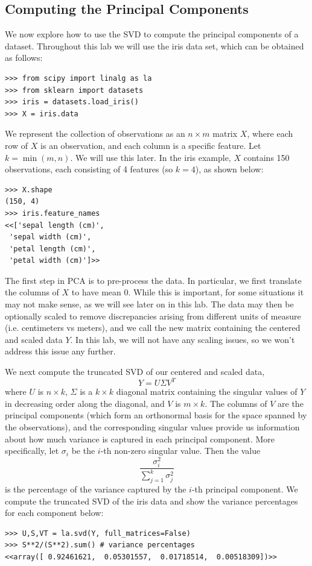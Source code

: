 \subsection*{Computing the Principal Components}
We now explore how to use the SVD to compute the principal components of a dataset.
Throughout this lab we will use the  iris data set, which can be obtained as follows:
\begin{lstlisting}
>>> from scipy import linalg as la
>>> from sklearn import datasets
>>> iris = datasets.load_iris()
>>> X = iris.data
\end{lstlisting}
We represent the collection of observations as an $n \times m$ matrix $X$, where each row of $X$ is an observation, and each column is a specific feature.
Let $k = \min(m,n)$.  We will use this later.
In the iris example, $X$ contains 150 observations, each consisting of 4 features (so $k = 4$), as shown below:
\begin{lstlisting}
>>> X.shape
(150, 4)
>>> iris.feature_names
<<['sepal length (cm)',
 'sepal width (cm)',
 'petal length (cm)',
 'petal width (cm)']>>
\end{lstlisting}

The first step in PCA is to pre-process the data. In particular, we first translate the columns of $X$ to have mean 0. 
While this is important, for some situations it may not make sense, as we will see later on in this lab.
The data may then be optionally scaled to remove discrepancies arising from different units of measure (i.e. centimeters vs meters), and we call the new matrix containing the centered and scaled data $Y$.
In this lab, we will not have any scaling issues, so we won't address this issue any further.

We next compute the truncated SVD of our centered and scaled data,
\[Y = U\Sigma V^{T}\]
where $U$ is $n \times k$, $\Sigma$ is a $k\times k$ diagonal matrix containing the singular values of $Y$ in decreasing order along the diagonal, and $V$ is $m \times k$. The columns of $V$ are the principal components (which form an orthonormal basis for the space spanned by the observations), and the corresponding singular values provide us information about how much variance is captured in each principal component. More specifically, let $\sigma_{i}$ be the $i$-th non-zero singular value. Then the value
\[\frac{\sigma^2_{i}}{\sum_{j=1}^{k} \sigma^2_{j}}\]
is the percentage of the variance captured by the $i$-th principal component.
We compute the truncated SVD of the iris data and show the variance percentages for each component below:
\begin{lstlisting}
>>> U,S,VT = la.svd(Y, full_matrices=False)
>>> S**2/(S**2).sum() # variance percentages
<<array([ 0.92461621,  0.05301557,  0.01718514,  0.00518309])>>
\end{lstlisting}

